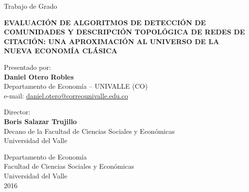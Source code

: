 \documentclass[12pt,letter]{article}
\begin{document}
\thispagestyle{empty}

\begin{center}
\vfill Trabajo de Grado\\


\begin{spacing}{1.5}
\vfill {\bf\LARGE EVALUACIÓN DE ALGORITMOS DE DETECCIÓN DE COMUNIDADES Y DESCRIPCIÓN TOPOLÓGICA DE REDES DE CITACIÓN: UNA APROXIMACIÓN AL UNIVERSO DE LA NUEVA ECONOMÍA CLÁSICA}
\end{spacing}




\vfill {Presentado por:  \\
\textbf{Daniel Otero Robles} \\ 
Departamento de Economía -- UNIVALLE (CO) \\
e-mail: {\small\underline{daniel.otero@correounivalle.edu.co}}\\ \vspace{0.5cm}}

\vfill {Director:  \\
\textbf{Boris Salazar Trujillo}\\ 
Decano de la Facultad de Ciencias Sociales y Económicas \\
Universidad del Valle \\\vspace{0.5cm}}



\vfill {\sc Departamento de Economía \\
Facultad de  Ciencias Sociales y Económicas 
\\ Universidad del Valle \\ 2016}

\end{center}

\newpage
$\ $
\thispagestyle{empty} 

\newpage
\thispagestyle{empty}
\end{document}
